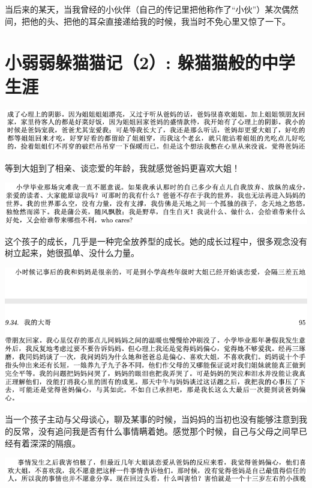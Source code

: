 \documentclass[9pt, b5paper]{article}
\begin{document}
当后来的某天，当我曾经的小伙伴（自己的传记里把他称作了“小伙”）某次偶然间，把他的头、把他的耳朵直接递给我的时候，我当时不免心里又惊了一下。

\section{小弱弱躲猫猫记（2）: 躲猫猫般的中学生涯}
\label{sec:org94bda22}

\begin{center}
\includegraphics[width=.9\linewidth]{./pic/backups_plans_20210422_101254.png}
\end{center}

等到大姐到了相亲、谈恋爱的年龄，我就感觉爸妈更喜欢大姐！

\begin{center}
\includegraphics[width=.9\linewidth]{./pic/backups_plans_20210422_095031.png}
\end{center}

这个孩子的成长，几乎是一种完全放养型的成长。她的成长过程中，很多观念没有树立起来，她很孤单、没什么力量。 

\begin{center}
\includegraphics[width=.9\linewidth]{./pic/backups_plans_20210422_094911.png}
\end{center}

当一个孩子主动与父母谈心，聊及某事的时候，当妈妈的当初也没有能够注意到我的反常，没有追问我是否有什么事情瞒着她。感觉那个时候，自己与父母之间早已经有着深深的隔痕。

\begin{center}
\includegraphics[width=.9\linewidth]{./pic/backups_plans_20210422_101554.png}
\end{center}
\end{document}

